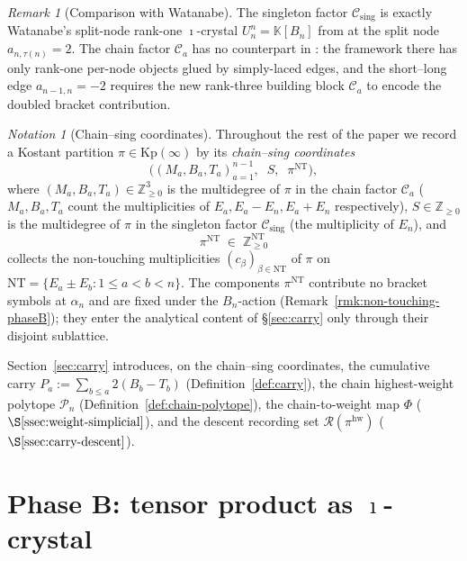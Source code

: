 \documentclass[11pt]{article}
\theoremstyle{definition}
\theoremstyle{remark}
\newtheorem{remark}[theorem]{Remark}
\newtheorem{notation}[theorem]{Notation}
\newcommand{\Kp}{\mathrm{Kp}}
\newcommand{\NT}{\mathrm{NT}}
\newcommand{\KK}{\mathbb{K}}
\newcommand{\Z}{\mathbb{Z}}
\newcommand{\Zn}{\Z_{\geq 0}}
\newcommand{\Cmid}{\mathcal{C}}
\newcommand{\Csing}{\mathcal{C}_{\mathrm{sing}}}
\newcommand{\Pn}{\mathcal{P}}
\newcommand{\hw}{\mathrm{hw}}
\newcommand{\piNT}{\pi^{\NT}}
\newcommand{\Rec}{\mathcal{R}}
\begin{document}
\begin{remark}[Comparison with Watanabe]\label{rmk:watanabe-vs-chain}
The singleton factor $\Csing$ is exactly Watanabe's split-node rank-one $\imath$-crystal
$U^n_n = \KK[B_n]$ from \cite[\S4.1]{Watanabe2110} at the split node $a_{n,\tau(n)} = 2$.
The chain factor $\Cmid_a$ has no counterpart in \cite{Watanabe2110}: the framework there has
only rank-one per-node objects glued by simply-laced edges, and the short--long edge $a_{n-1,n}
= -2$ requires the new rank-three building block $\Cmid_a$ to encode the doubled bracket
contribution.
\end{remark}

\begin{notation}[Chain--sing coordinates]\label{not:chain-sing}
Throughout the rest of the paper we record a Kostant partition $\pi \in \Kp(\infty)$ by its
\emph{chain--sing coordinates}
\[
   \bigl((M_a, B_a, T_a)_{a = 1}^{n - 1},\;\; S,\;\; \piNT\bigr),
\]
where $(M_a, B_a, T_a) \in \Zn^3$ is the multidegree of $\pi$ in the chain factor $\Cmid_a$
($M_a, B_a, T_a$ count the multiplicities of $E_a, E_a - E_n, E_a + E_n$ respectively),
$S \in \Zn$ is the multidegree of $\pi$ in the singleton factor $\Csing$ (the multiplicity
of $E_n$), and
\[
   \piNT \;\in\; \Zn^{\NT}
\]
collects the non-touching multiplicities $(c_\beta)_{\beta \in \NT}$ of $\pi$ on $\NT =
\{E_a \pm E_b : 1 \le a < b < n\}$. The components $\piNT$ contribute no bracket symbols at
$\alpha_n$ and are fixed under the $B_n$-action (Remark~\ref{rmk:non-touching-phaseB}); they
enter the analytical content of \S\ref{sec:carry} only through their disjoint sublattice.

Section~\ref{sec:carry} introduces, on the chain--sing coordinates, the cumulative carry
$P_a := \sum_{b \le a} 2(B_b - T_b)$ (Definition~\ref{def:carry}), the chain highest-weight
polytope $\Pn_n$ (Definition~\ref{def:chain-polytope}), the chain-to-weight map $\Phi$
($\S\ref{ssec:weight-simplicial}$), and the descent recording set $\Rec(\pi^{\hw})$
($\S\ref{ssec:carry-descent}$).
\end{notation}



\section{Phase B: tensor product as $\imath$-crystal}\label{sec:phaseB}
\end{document}
